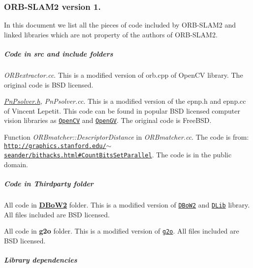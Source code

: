 \subsubsection*{O\-R\-B-\/\-S\-L\-A\-M2 version 1.}

In this document we list all the pieces of code included by O\-R\-B-\/\-S\-L\-A\-M2 and linked libraries which are not property of the authors of O\-R\-B-\/\-S\-L\-A\-M2.

\subparagraph*{Code in {\bfseries src} and {\bfseries include} folders}


\begin{DoxyItemize}
\item {\itshape O\-R\-Bextractor.\-cc}. This is a modified version of orb.\-cpp of Open\-C\-V library. The original code is B\-S\-D licensed.
\item {\itshape \hyperlink{PnPsolver_8h_source}{Pn\-Psolver.\-h}, Pn\-Psolver.\-cc}. This is a modified version of the epnp.\-h and epnp.\-cc of Vincent Lepetit. This code can be found in popular B\-S\-D licensed computer vision libraries as \href{https://github.com/Itseez/opencv/blob/master/modules/calib3d/src/epnp.cpp}{\tt Open\-C\-V} and \href{https://github.com/laurentkneip/opengv/blob/master/src/absolute_pose/modules/Epnp.cpp}{\tt Open\-G\-V}. The original code is Free\-B\-S\-D.
\item Function {\itshape O\-R\-Bmatcher\-::\-Descriptor\-Distance} in {\itshape O\-R\-Bmatcher.\-cc}. The code is from\-: \href{http://graphics.stanford.edu/~seander/bithacks.html#CountBitsSetParallel}{\tt http\-://graphics.\-stanford.\-edu/$\sim$seander/bithacks.\-html\#\-Count\-Bits\-Set\-Parallel}. The code is in the public domain.
\end{DoxyItemize}

\subparagraph*{Code in Thirdparty folder}


\begin{DoxyItemize}
\item All code in {\bfseries \hyperlink{namespaceDBoW2}{D\-Bo\-W2}} folder. This is a modified version of \href{https://github.com/dorian3d/DBoW2}{\tt D\-Bo\-W2} and \href{https://github.com/dorian3d/DLib}{\tt D\-Lib} library. All files included are B\-S\-D licensed.
\item All code in {\bfseries g2o} folder. This is a modified version of \href{https://github.com/RainerKuemmerle/g2o}{\tt g2o}. All files included are B\-S\-D licensed.
\end{DoxyItemize}

\subparagraph*{Library dependencies}


